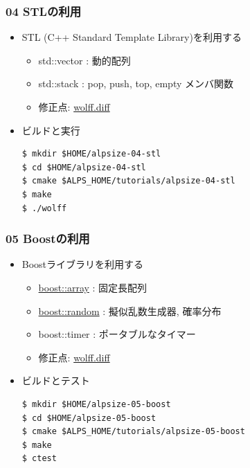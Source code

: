 \begin{frame}[fragile]
  \frametitle{04 STLの利用}
  \begin{itemize}
    \item STL (C++ Standard Template Library)を利用する
      \begin{itemize}
        \item std::vector : 動的配列
        \item std::stack : pop, push, top, empty メンバ関数
        \item 修正点: \href{https://github.com/cmsi/alps-tutorial/blob/develop/alpsize/04-wolff.diff}{wolff.diff}
      \end{itemize}
    \item ビルドと実行
\begin{lstlisting}
$ mkdir $HOME/alpsize-04-stl
$ cd $HOME/alpsize-04-stl
$ cmake $ALPS_HOME/tutorials/alpsize-04-stl
$ make
$ ./wolff
\end{lstlisting}
  \end{itemize}
\end{frame}

\begin{frame}[fragile]
  \frametitle{05 Boostの利用}
  \begin{itemize}
    \item Boostライブラリを利用する
      \begin{itemize}
        \item \href{http://boost.org/doc/html/array.html}{boost::array} : 固定長配列
        \item \href{http://boost.org/doc/html/boost_random.html}{boost::random} : 擬似乱数生成器, 確率分布
        \item boost::timer : ポータブルなタイマー
        \item 修正点: \href{https://github.com/cmsi/alps-tutorial/blob/develop/alpsize/05-wolff.diff}{wolff.diff}
      \end{itemize}
    \item ビルドとテスト
\begin{lstlisting}
$ mkdir $HOME/alpsize-05-boost
$ cd $HOME/alpsize-05-boost
$ cmake $ALPS_HOME/tutorials/alpsize-05-boost
$ make
$ ctest
\end{lstlisting}
  \end{itemize}
\end{frame}


